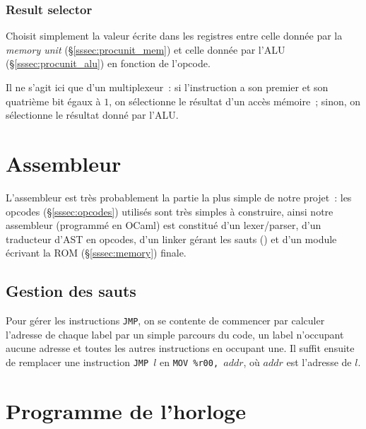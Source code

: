 \documentclass[11pt,a4paper]{article}
\newcommand{\relire}{}
\newcommand{\relu}[1]{}
\begin{document}
\subsubsection{Result selector}

\relire
\relu{Théo}

Choisit simplement la valeur écrite dans les registres entre celle donnée par la \textit{memory unit} (§\ref{sssec:procunit_mem}) et celle donnée par l'ALU (§\ref{sssec:procunit_alu}) en fonction de l'opcode.

Il ne s'agit ici que d'un multiplexeur~: si l'instruction a son premier et son quatrième bit égaux à $1$, on sélectionne le résultat d'un accès mémoire~; sinon, on sélectionne le résultat donné par l'ALU.

\section{Assembleur} \label{sec:cas}

L'assembleur est très probablement la partie la plus simple de notre projet~: les opcodes (§\ref{sssec:opcodes}) utilisés sont très simples à construire, ainsi notre assembleur (programmé en OCaml) est constitué d'un lexer/parser, d'un traducteur d'AST en opcodes, d'un \og linker \fg{} gérant les sauts () et d'un module écrivant la ROM (§\ref{sssec:memory}) finale.

\subsection{Gestion des sauts}

Pour gérer les instructions \verb!JMP!, on se contente de commencer
par calculer l'adresse de chaque label par un simple parcours du code,
un label n'occupant aucune adresse et toutes les autres instructions
en occupant une. Il suffit ensuite de remplacer une instruction
\verb!JMP!~$l$ en \verb!MOV %r00, !$addr$, où $addr$ est l'adresse de
$l$.


\section{Programme de l'horloge} \label{sec:clock}

\relire
\relu{Nathanaël} \relu{Théo} \relu{No}
\end{document}
